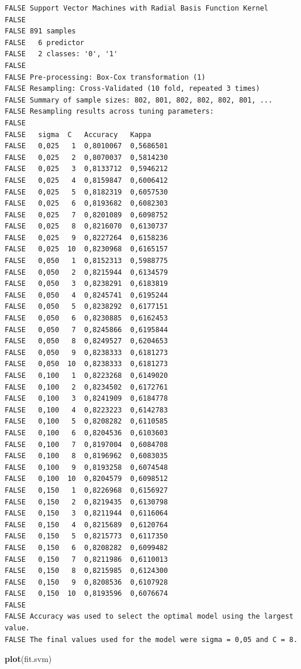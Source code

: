 \documentclass[]{article}
\newenvironment{Shaded}{\begin{snugshade}}{\end{snugshade}}
\newcommand{\KeywordTok}[1]{\textcolor[rgb]{0.13,0.29,0.53}{\textbf{#1}}}
\newcommand{\NormalTok}[1]{#1}
\begin{document}
\begin{verbatim}
FALSE Support Vector Machines with Radial Basis Function Kernel 
FALSE 
FALSE 891 samples
FALSE   6 predictor
FALSE   2 classes: '0', '1' 
FALSE 
FALSE Pre-processing: Box-Cox transformation (1) 
FALSE Resampling: Cross-Validated (10 fold, repeated 3 times) 
FALSE Summary of sample sizes: 802, 801, 802, 802, 802, 801, ... 
FALSE Resampling results across tuning parameters:
FALSE 
FALSE   sigma  C   Accuracy   Kappa    
FALSE   0,025   1  0,8010067  0,5686501
FALSE   0,025   2  0,8070037  0,5814230
FALSE   0,025   3  0,8133712  0,5946212
FALSE   0,025   4  0,8159847  0,6006412
FALSE   0,025   5  0,8182319  0,6057530
FALSE   0,025   6  0,8193682  0,6082303
FALSE   0,025   7  0,8201089  0,6098752
FALSE   0,025   8  0,8216070  0,6130737
FALSE   0,025   9  0,8227264  0,6158236
FALSE   0,025  10  0,8230968  0,6165157
FALSE   0,050   1  0,8152313  0,5988775
FALSE   0,050   2  0,8215944  0,6134579
FALSE   0,050   3  0,8238291  0,6183819
FALSE   0,050   4  0,8245741  0,6195244
FALSE   0,050   5  0,8238292  0,6177151
FALSE   0,050   6  0,8230885  0,6162453
FALSE   0,050   7  0,8245866  0,6195844
FALSE   0,050   8  0,8249527  0,6204653
FALSE   0,050   9  0,8238333  0,6181273
FALSE   0,050  10  0,8238333  0,6181273
FALSE   0,100   1  0,8223268  0,6149020
FALSE   0,100   2  0,8234502  0,6172761
FALSE   0,100   3  0,8241909  0,6184778
FALSE   0,100   4  0,8223223  0,6142783
FALSE   0,100   5  0,8208282  0,6110585
FALSE   0,100   6  0,8204536  0,6103603
FALSE   0,100   7  0,8197004  0,6084708
FALSE   0,100   8  0,8196962  0,6083035
FALSE   0,100   9  0,8193258  0,6074548
FALSE   0,100  10  0,8204579  0,6098512
FALSE   0,150   1  0,8226968  0,6156927
FALSE   0,150   2  0,8219435  0,6130798
FALSE   0,150   3  0,8211944  0,6116064
FALSE   0,150   4  0,8215689  0,6120764
FALSE   0,150   5  0,8215773  0,6117350
FALSE   0,150   6  0,8208282  0,6099482
FALSE   0,150   7  0,8211986  0,6110013
FALSE   0,150   8  0,8215985  0,6124300
FALSE   0,150   9  0,8208536  0,6107928
FALSE   0,150  10  0,8193596  0,6076674
FALSE 
FALSE Accuracy was used to select the optimal model using the largest value.
FALSE The final values used for the model were sigma = 0,05 and C = 8.
\end{verbatim}

\begin{Shaded}
\begin{Highlighting}[]
\KeywordTok{plot}\NormalTok{(fit.svm)}
\end{Highlighting}
\end{Shaded}
\end{document}
